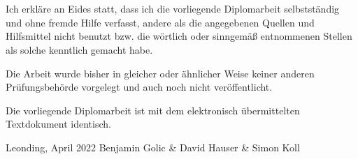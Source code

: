 \thispagestyle{empty}
\vspace{3cm}
~ \\ \\
Ich erkläre an Eides statt, dass ich die vorliegende Diplomarbeit selbstständig und ohne fremde Hilfe verfasst, andere als die angegebenen Quellen und Hilfsmittel nicht benutzt bzw. die wörtlich oder sinngemäß entnommenen Stellen als solche kenntlich gemacht habe.

Die Arbeit wurde bisher in gleicher oder ähnlicher Weise keiner anderen Prüfungsbehörde vorgelegt und auch noch nicht veröffentlicht.

Die vorliegende Diplomarbeit ist mit dem elektronisch übermittelten Textdokument identisch.
\vspace{3cm}
\begin{tabbing}
Leonding, April 2022 \hspace{5cm} Benjamin Golic \& \linebreak David Hauser \& \linebreak Simon Koll
\end{tabbing}
\vspace{10cm}
\newpage
\setcounter{page}{1}
